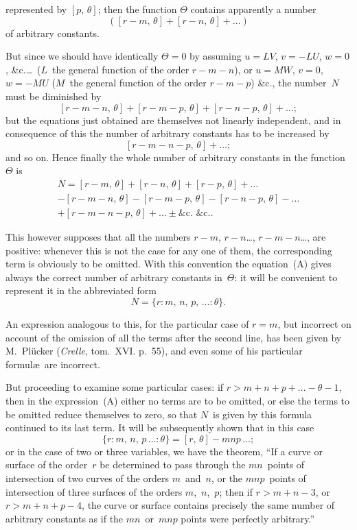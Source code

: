 \documentclass[11pt,a4paper]{book}
\begin{document}
\vspace{6pt}

represented by $[p,\,\theta]$; then the function $\Theta$ contains apparently a number
\[
([r-m,\,\theta] + [r-n,\,\theta] + \ldots)
\]
of arbitrary constants.

But since we should have identically $\Theta = 0$ by assuming $u = LV$, $v = -LU$, $w = 0$, \&c.\ldots\ ($L$~the general function of the order $r-m-n$), or $u = MW$, $v = 0$, $w = -MU$ ($M$~the general function of the order $r-m-p$) \&c., the number~$N$ must be diminished by
\[
[r-m-n,\,\theta] + [r-m-p,\,\theta] + [r-n-p,\,\theta] + \ldots;
\]
but the equations just obtained are themselves not linearly independent, and in consequence of this the number of arbitrary constants has to be increased by
\[
[r-m-n-p,\,\theta] + \ldots;
\]
and so on. Hence finally the whole number of arbitrary constants in the function~$\Theta$ is
\begin{multline*}
N = [r-m,\,\theta] + [r-n,\,\theta] + [r-p,\,\theta] + \ldots \\
- [r-m-n,\,\theta] - [r-m-p,\,\theta] - [r-n-p,\,\theta] - \ldots \\
+ [r-m-n-p,\,\theta] + \ldots \pm \text{\&c.\ \&c.} \tag{A}.
\end{multline*}

This however supposes that all the numbers $r-m$, $r-n$\ldots, $r-m-n$\ldots, are positive: whenever this is not the case for any one of them, the corresponding term is obviously to be omitted. With this convention the equation~(A) gives always the correct number of arbitrary constants in~$\Theta$: it will be convenient to represent it in the abbreviated form
\[
N = \{r : m,\, n,\, p,\, \ldots : \theta\}.
\]

An expression analogous to this, for the particular case of $r=m$, but incorrect on account of the omission of all the terms after the second line, has been given by M.~Pl\"ucker (\textit{Crelle}, tom.~XVI. p.~55), and even some of his particular formul\ae\ are incorrect.

But proceeding to examine some particular cases: if $r > m+n+p+\ldots - \theta - 1$, then in the expression~(A) either no terms are to be omitted, or else the terms to be omitted reduce themselves to zero, so that $N$~is given by this formula continued to its last term. It will be subsequently shown that in this case
\[
\{r : m,\, n,\, p\, \ldots : \theta\} = [r,\,\theta] - mnp\, \ldots;
\]
or in the case of two or three variables, we have the theorem, ``If a curve or surface of the order~$r$ be determined to pass through the $mn$~points of intersection of two curves of the orders $m$~and~$n$, or the $mnp$~points of intersection of three surfaces of the orders $m$,~$n$,~$p$; then if $r > m+n-3$, or $r > m+n+p-4$, the curve or surface contains precisely the same number of arbitrary constants as if the $mn$~or~$mnp$ points were perfectly arbitrary.''
\end{document}
